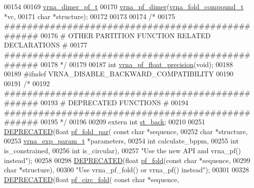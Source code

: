 \begin{DoxyCode}
00154 
00169 \mbox{\hyperlink{group__pf__cofold_structvrna__dimer__pf__s}{vrna\_dimer\_pf\_t}}
00170 \mbox{\hyperlink{group__pf__cofold_ga4e5c7d06c302a7c59fc0d64dc142ca63}{vrna\_pf\_dimer}}(\mbox{\hyperlink{group__fold__compound_structvrna__fc__s}{vrna\_fold\_compound\_t}}  *vc,
00171               \textcolor{keywordtype}{char}                  *structure);
00172 
00173 
00174 \textcolor{comment}{/*}
00175 \textcolor{comment}{#################################################}
00176 \textcolor{comment}{# OTHER PARTITION FUNCTION RELATED DECLARATIONS #}
00177 \textcolor{comment}{#################################################}
00178 \textcolor{comment}{*/}
00179 
00187 \textcolor{keywordtype}{int} \mbox{\hyperlink{part__func_8h_ad2b3594f0b50b68029e0f54fdce59313}{vrna\_pf\_float\_precision}}(\textcolor{keywordtype}{void});
00188 
00189 \textcolor{preprocessor}{#ifndef VRNA\_DISABLE\_BACKWARD\_COMPATIBILITY}
00190 
00191 \textcolor{comment}{/*}
00192 \textcolor{comment}{#################################################}
00193 \textcolor{comment}{# DEPRECATED FUNCTIONS                          #}
00194 \textcolor{comment}{#################################################}
00195 \textcolor{comment}{*/}
00196 
00209 \textcolor{keyword}{extern}  \textcolor{keywordtype}{int} \mbox{\hyperlink{group__subopt__stochbt_gacd79b1a570e6ad9be24cb11fe8cae30a}{st\_back}};
00210 
00251 \mbox{\hyperlink{part__func_8h_aab347a3c03fbe8e7319551b9fa0cce4a}{DEPRECATED}}(\textcolor{keywordtype}{float}   \mbox{\hyperlink{group__pf__fold_gac4f95bee734b2563a3d6e9932117ebdf}{pf\_fold\_par}}(  \textcolor{keyword}{const} \textcolor{keywordtype}{char} *sequence,
00252                       \textcolor{keywordtype}{char} *structure,
00253                       \mbox{\hyperlink{group__energy__parameters_structvrna__exp__param__s}{vrna\_exp\_param\_t}} *parameters,
00254                       \textcolor{keywordtype}{int} calculate\_bppm,
00255                       \textcolor{keywordtype}{int} is\_constrained,
00256                       \textcolor{keywordtype}{int} is\_circular),
00257 \textcolor{stringliteral}{"Use the new API and vrna\_pf() instead"});
00258 
00298 \mbox{\hyperlink{part__func_8h_aab347a3c03fbe8e7319551b9fa0cce4a}{DEPRECATED}}(\textcolor{keywordtype}{float}   \mbox{\hyperlink{group__pf__fold_gadc3db3d98742427e7001a7fd36ef28c2}{pf\_fold}}(\textcolor{keyword}{const} \textcolor{keywordtype}{char} *sequence,
00299                 \textcolor{keywordtype}{char} *structure),
00300 \textcolor{stringliteral}{"Use vrna\_pf\_fold() or vrna\_pf() instead"});
00301 
00328 \mbox{\hyperlink{part__func_8h_aab347a3c03fbe8e7319551b9fa0cce4a}{DEPRECATED}}(\textcolor{keywordtype}{float}   \mbox{\hyperlink{group__pf__fold_ga819ce5fca8984004ac81c4a3b04cb735}{pf\_circ\_fold}}( \textcolor{keyword}{const} \textcolor{keywordtype}{char} *sequence,

\end{DoxyCode}
